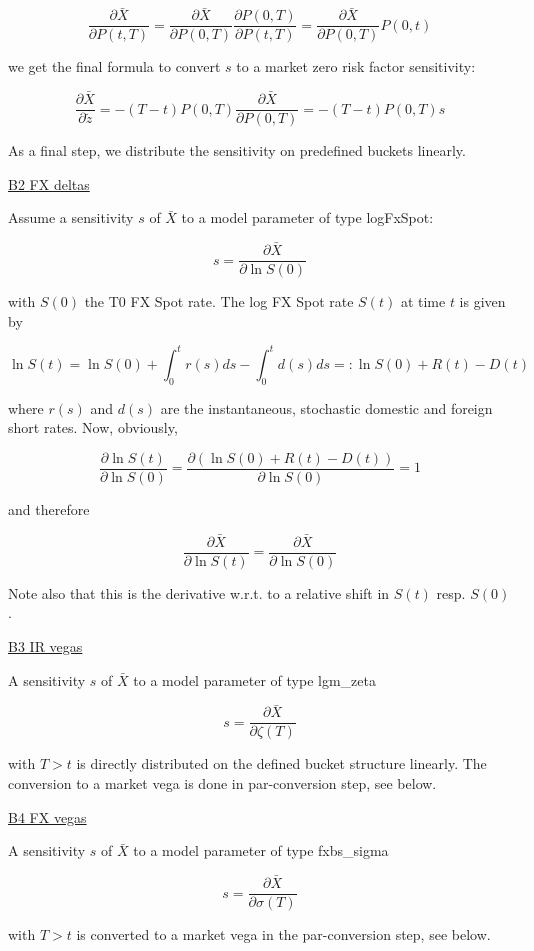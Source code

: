 $$
\frac{\partial \bar{X}}{\partial P(t,T)} = \frac{\partial \bar{X}}{\partial P(0,T)} \frac{\partial P(0,T)}{\partial P(t,T)} =  \frac{\partial \bar{X}}{\partial P(0,T)} P(0,t)
$$

we get the final formula to convert $s$ to a market zero risk factor sensitivity:

$$
\frac{\partial \bar{X}}{\partial{\tilde{z}}} = -(T-t) P(0,T) \frac{\partial \bar{X}}{\partial P(0,T)} = -(T-t) P(0,T) s
$$

As a final step, we distribute the sensitivity on predefined buckets linearly.

\underline{B2  FX deltas}

Assume a sensitivity $s$ of $\bar{X}$ to a model parameter of type logFxSpot:

$$
s = \frac{\partial\bar{X}}{\partial \ln S(0)}
$$

with $S(0)$ the T0 FX Spot rate. The log FX Spot rate $S(t)$ at time $t$ is given by

$$
\ln S(t) = \ln S(0) + \int_0^t r(s) ds - \int_0^t d(s) ds =: \ln S(0) + R(t) - D(t)
$$

where $r(s)$ and $d(s)$ are the instantaneous, stochastic domestic and foreign short rates. Now, obviously,

$$
\frac{\partial \ln S(t)}{\partial \ln S(0)} = \frac{\partial \left( \ln S(0) + R(t) - D(t) \right)}{\partial \ln S(0)} = 1
$$

and therefore

$$
\frac{\partial \bar{X}}{\partial \ln S(t)} = \frac{\partial \bar{X}}{\partial \ln S(0)}
$$

Note also that this is the derivative w.r.t. to a relative shift in $S(t)$ resp. $S(0)$.

\underline{B3  IR vegas}

A sensitivity $s$ of $\bar{X}$ to a model parameter of type lgm\_zeta

$$
s = \frac{\partial\bar{X}}{\partial \zeta(T)}
$$

with $T>t$ is directly distributed on the defined bucket structure linearly. The conversion to a market vega is done in
par-conversion step, see below.


\underline{B4  FX vegas}

A sensitivity $s$ of $\bar{X}$ to a model parameter of type fxbs\_sigma

$$
s = \frac{\partial\bar{X}}{\partial \sigma(T)}
$$

with $T>t$ is converted to a market vega in the par-conversion step, see below.


